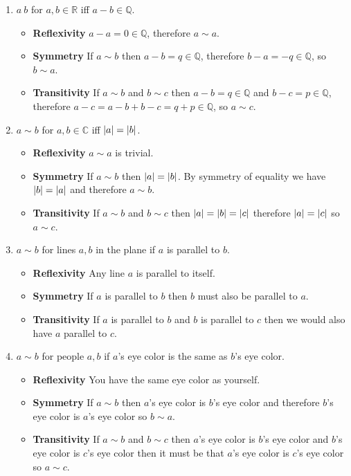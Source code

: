 \documentclass{article}
\begin{document}
\begin{enumerate}
	\item $a ~ b$ for $a,b \in \mathbb R$ iff $a - b \in\mathbb Q$.
	\begin{itemize}
		\item \textbf{Reflexivity} $a - a = 0 \in \mathbb Q$, therefore $a \sim a$.
		\item \textbf{Symmetry} If $a\sim b$ then $a-b =q \in\mathbb Q$, therefore $b-a=-q\in\mathbb Q$, so $b\sim a$.
		\item \textbf{Transitivity} If $a\sim b$ and $b \sim c$ then $a-b = q \in\mathbb Q$ and $b - c = p \in\mathbb Q$, therefore $a-c = a-b+b-c = q + p \in\mathbb Q$, so $a \sim c$.
	\end{itemize}
	\item $a \sim b$ for $a,b\in\mathbb C$ iff $\left|{a}\right| = \left|{b}\right|$.
	\begin{itemize}
		\item \textbf{Reflexivity} $a \sim a$ is trivial.
		\item \textbf{Symmetry} If $a\sim b$ then $\left|{a}\right| = \left|{b}\right|$. By symmetry of equality we have $\left|{b}\right| = \left|{a}\right|$ and therefore $a \sim b$.
		\item \textbf{Transitivity} If $a\sim b$ and $b\sim c$ then $\left|{a}\right| = \left|{b}\right| = \left|{c}\right|$ therefore $\left|{a}\right| = \left|{c}\right|$ so $a \sim c$.
	\end{itemize}
	\item $a \sim b$ for lines $a,b$ in the plane if $a$ is parallel to $b$.
	\begin{itemize}
		\item \textbf{Reflexivity} Any line $a$ is parallel to itself.
		\item \textbf{Symmetry} If $a$ is parallel to $b$ then $b$ must also be parallel to $a$.
		\item \textbf{Transitivity} If $a$ is parallel to $b$ and $b$ is parallel to $c$ then we would also have $a$ parallel to $c$.
	\end{itemize}
	\item $a \sim b$ for people $a,b$ if $a$'s eye color is the same as $b$'s eye color.
	\begin{itemize}
		\item \textbf{Reflexivity} You have the same eye color as yourself.
		\item \textbf{Symmetry} If $a\sim b$ then $a$'s eye color is $b$'s eye color and therefore $b$'s eye color is $a$'s eye color so $b \sim a$.
		\item \textbf{Transitivity} If $a\sim b$ and $b \sim c$ then $a$'s eye color is $b$'s eye color and $b$'s eye color is $c$'s eye color then it must be that $a$'s eye color is $c$'s eye color so $a \sim c$.
	\end{itemize}
\end{enumerate}
\end{document}
